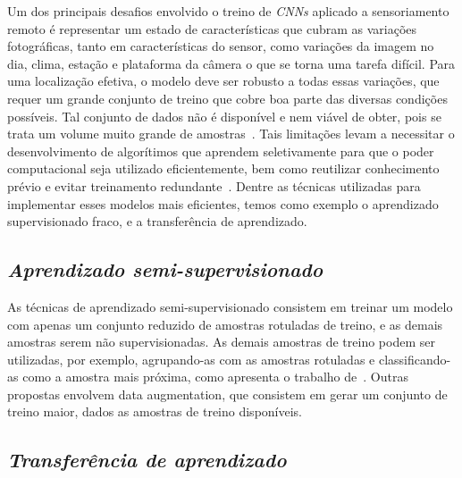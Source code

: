 Um dos principais desafios envolvido o treino de \textit{CNNs} aplicado a sensoriamento remoto é representar um estado de características que cubram as variações fotográficas, tanto em características do sensor, como variações da imagem no dia, clima, estação e plataforma da câmera o que se torna uma tarefa difícil. Para uma localização efetiva, o modelo deve ser robusto a todas essas variações, que requer um grande conjunto de treino que cobre boa parte das diversas condições possíveis. Tal conjunto de dados não é disponível e nem viável de obter, pois se trata um volume muito grande de amostras~\cite{rs13194017}. Tais limitações levam a necessitar o desenvolvimento de algorítimos que aprendem seletivamente para que o poder computacional seja utilizado eficientemente, bem como reutilizar conhecimento prévio e evitar treinamento redundante~\cite{rostami2019learning}.  Dentre as técnicas utilizadas para implementar esses modelos mais eficientes, temos como exemplo o aprendizado supervisionado fraco, e a transferência de aprendizado.

\subsection{\textit{Aprendizado semi-supervisionado}}\label{sec:Cap2_semisup}

As técnicas de aprendizado semi-supervisionado consistem em treinar um modelo com apenas um conjunto reduzido de amostras rotuladas de treino, e as demais amostras serem não supervisionadas. As demais amostras de treino podem ser utilizadas, por exemplo, agrupando-as com as amostras rotuladas e classificando-as como a amostra mais próxima, como apresenta o trabalho de~\cite{Sanches2003}. Outras propostas envolvem data augmentation, que consistem em gerar um conjunto de treino maior, dados as amostras de treino disponíveis.

\subsection{\textit{Transferência de aprendizado}}\label{sec:Cap2_transfer}

